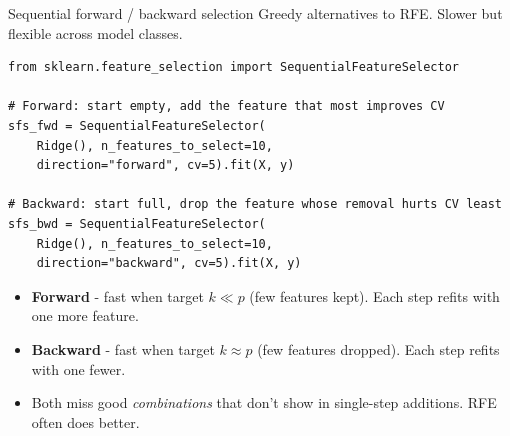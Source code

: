 \documentclass[aspectratio=169]{beamer}
\begin{document}
\begin{frame}[fragile]{Sequential forward / backward selection}
  Greedy alternatives to RFE. Slower but flexible across model classes.
  \vfill
{\lstset{basicstyle=\ttfamily\scriptsize}
\begin{lstlisting}
from sklearn.feature_selection import SequentialFeatureSelector

# Forward: start empty, add the feature that most improves CV
sfs_fwd = SequentialFeatureSelector(
    Ridge(), n_features_to_select=10,
    direction="forward", cv=5).fit(X, y)

# Backward: start full, drop the feature whose removal hurts CV least
sfs_bwd = SequentialFeatureSelector(
    Ridge(), n_features_to_select=10,
    direction="backward", cv=5).fit(X, y)
\end{lstlisting}}
  \vfill
  \begin{itemize}\small
    \item \textbf{Forward} - fast when target $k \ll p$ (few features kept). Each step refits with one more feature.
    \item \textbf{Backward} - fast when target $k \approx p$ (few features dropped). Each step refits with one fewer.
    \item Both miss good \emph{combinations} that don't show in single-step additions. RFE often does better.
  \end{itemize}
\end{frame}
\end{document}
